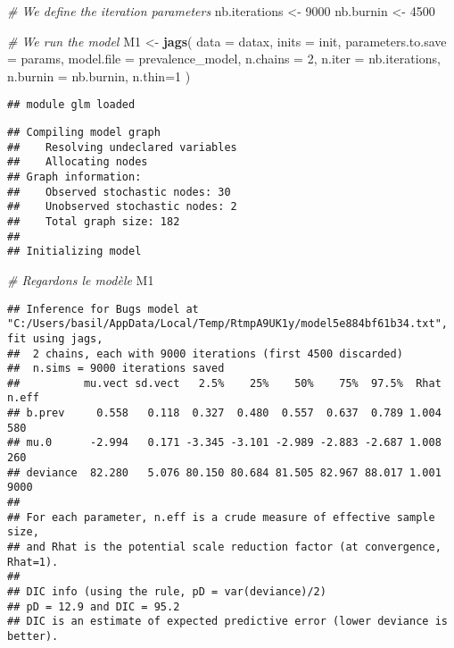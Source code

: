 \documentclass[
]{article}
\newenvironment{Shaded}{\begin{snugshade}}{\end{snugshade}}
\newcommand{\AttributeTok}[1]{\textcolor[rgb]{0.13,0.29,0.53}{#1}}
\newcommand{\CommentTok}[1]{\textcolor[rgb]{0.56,0.35,0.01}{\textit{#1}}}
\newcommand{\DecValTok}[1]{\textcolor[rgb]{0.00,0.00,0.81}{#1}}
\newcommand{\FunctionTok}[1]{\textcolor[rgb]{0.13,0.29,0.53}{\textbf{#1}}}
\newcommand{\NormalTok}[1]{#1}
\newcommand{\OtherTok}[1]{\textcolor[rgb]{0.56,0.35,0.01}{#1}}
\begin{document}
\begin{Shaded}
\begin{Highlighting}[]
\CommentTok{\# We define the iteration parameters}
\NormalTok{nb.iterations }\OtherTok{\textless{}{-}} \DecValTok{9000}
\NormalTok{nb.burnin }\OtherTok{\textless{}{-}} \DecValTok{4500}

\CommentTok{\# We run the model}
\NormalTok{M1 }\OtherTok{\textless{}{-}} \FunctionTok{jags}\NormalTok{(}
  \AttributeTok{data =}\NormalTok{ datax,}
  \AttributeTok{inits =}\NormalTok{ init,}
  \AttributeTok{parameters.to.save =}\NormalTok{ params,}
  \AttributeTok{model.file =}\NormalTok{ prevalence\_model,}
  \AttributeTok{n.chains =} \DecValTok{2}\NormalTok{,}
  \AttributeTok{n.iter =}\NormalTok{ nb.iterations,}
  \AttributeTok{n.burnin =}\NormalTok{ nb.burnin,}
  \AttributeTok{n.thin=}\DecValTok{1}
\NormalTok{)}
\end{Highlighting}
\end{Shaded}

\begin{verbatim}
## module glm loaded
\end{verbatim}

\begin{verbatim}
## Compiling model graph
##    Resolving undeclared variables
##    Allocating nodes
## Graph information:
##    Observed stochastic nodes: 30
##    Unobserved stochastic nodes: 2
##    Total graph size: 182
## 
## Initializing model
\end{verbatim}

\begin{Shaded}
\begin{Highlighting}[]
\CommentTok{\# Regardons le modèle }
\NormalTok{M1}
\end{Highlighting}
\end{Shaded}

\begin{verbatim}
## Inference for Bugs model at "C:/Users/basil/AppData/Local/Temp/RtmpA9UK1y/model5e884bf61b34.txt", fit using jags,
##  2 chains, each with 9000 iterations (first 4500 discarded)
##  n.sims = 9000 iterations saved
##          mu.vect sd.vect   2.5%    25%    50%    75%  97.5%  Rhat n.eff
## b.prev     0.558   0.118  0.327  0.480  0.557  0.637  0.789 1.004   580
## mu.0      -2.994   0.171 -3.345 -3.101 -2.989 -2.883 -2.687 1.008   260
## deviance  82.280   5.076 80.150 80.684 81.505 82.967 88.017 1.001  9000
## 
## For each parameter, n.eff is a crude measure of effective sample size,
## and Rhat is the potential scale reduction factor (at convergence, Rhat=1).
## 
## DIC info (using the rule, pD = var(deviance)/2)
## pD = 12.9 and DIC = 95.2
## DIC is an estimate of expected predictive error (lower deviance is better).
\end{verbatim}
\end{document}
